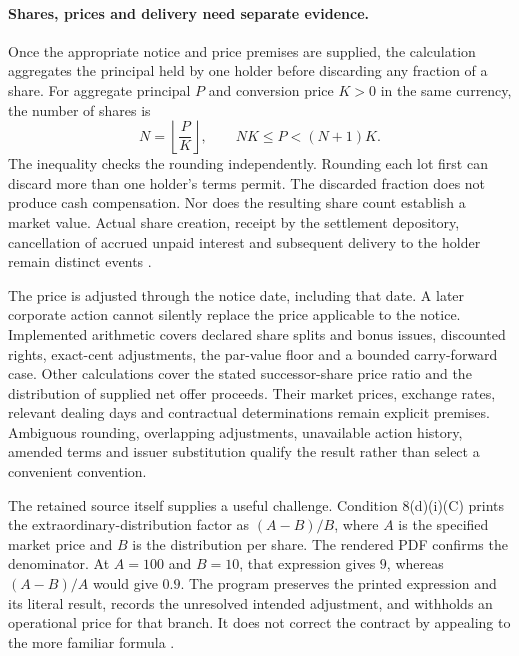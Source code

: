 \documentclass[12pt,a4paper,oneside,openany]{book}
\begin{document}
\paragraph{Shares, prices and delivery need separate evidence.}
Once the appropriate notice and price premises are supplied, the calculation
aggregates the principal held by one holder before discarding any fraction
of a share. For aggregate principal $P$ and conversion price $K>0$ in the
same currency, the number of shares is
\begin{equation}
  N=\left\lfloor\frac{P}{K}\right\rfloor,
  \qquad NK\leq P<(N+1)K.
  \label{eq:ubs-whole-shares}
\end{equation}
The inequality checks the rounding independently. Rounding each lot first
can discard more than one holder's terms permit. The discarded fraction
does not produce cash compensation. Nor does the resulting share count
establish a market value. Actual share creation, receipt by the settlement
depository, cancellation of accrued unpaid interest and subsequent delivery
to the holder remain distinct events
\citep[conditions~8(a)--(c), 8(g)--(j)]{ubsat12024}.

The price is adjusted through the notice date, including that date. A later
corporate action cannot silently replace the price applicable to the notice.
Implemented arithmetic covers declared share splits and bonus issues,
discounted rights, exact-cent adjustments, the par-value floor and a bounded
carry-forward case. Other calculations cover the stated successor-share price
ratio and the distribution of supplied net offer proceeds. Their market
prices, exchange rates, relevant dealing days and contractual determinations
remain explicit premises. Ambiguous rounding, overlapping adjustments,
unavailable action history, amended terms and issuer substitution qualify
the result rather than select a convenient convention.

The retained source itself supplies a useful challenge. Condition 8(d)(i)(C)
prints the extraordinary-distribution factor as $(A-B)/B$, where $A$ is the
specified market price and $B$ is the distribution per share. The rendered
PDF confirms the denominator. At $A=100$ and $B=10$, that expression gives
$9$, whereas $(A-B)/A$ would give $0.9$. The program preserves the printed
expression and its literal result, records the unresolved intended adjustment,
and withholds an operational price for that branch. It does not correct the
contract by appealing to the more familiar formula
\citep[condition~8(d)(i)(C), PDF p.~30]{ubsat12024}.
\end{document}
